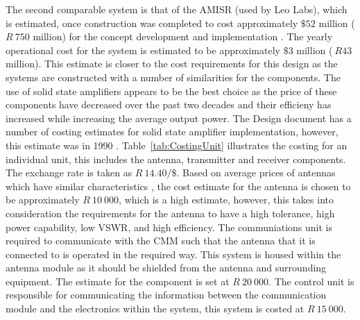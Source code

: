 \documentclass[11pt]{witseiepaper}
\begin{document}
The second comparable system is that of the AMISR (used by Leo Labs), which is estimated, once construction was completed to cost approximately $\$52$ million ($R~750$ million) for the concept development and implementation \cite[p.~333-337]{AMISRCosting}. The yearly operational cost for the system is estimated to be approximately $\$3$ million ($~R43$ million). This estimate is closer to the cost requirements for this design as the systems are constructed with a number of similarities for the components.
The use of solid state amplifiers appears to be the best choice as the price of these components have decreased over the past two decades and their efficieny has increased while increasing the average output power.
The Design document has a number of costing estimates for solid state amplifier implementation, however, this estimate was in 1990 \cite[p.~37]{DesignDraft}.
Table~\ref{tab:CostingUnit} illustrates the costing for an individual unit, this includes the antenna, transmitter and receiver components. The exchange rate is taken as $R~14.40/\$$.
Based on average prices of antennas which have similar characteristics \cite{AntennaPrice1,AntennaPrice2,AntennaPrice3,AntennaPrice4,AntennaPrice5}, the cost estimate for the antenna is chosen to be approximately $R~10~000$, which is a high estimate, however, this takes into consideration the requirements for the antenna to have a high tolerance, high power capability, low VSWR, and high efficiency. The communiations unit is required to communicate with the CMM such that the antenna that it is connected to is operated in the required way. This system is housed within the antenna module as it should be shielded from the antenna and surrounding equipment. The estimate for the component is set at $R~20~000$. The control unit is responsible for communicating the information between the communication module and the electronics within the system, this system is costed at $R~15~000$.
\end{document}
